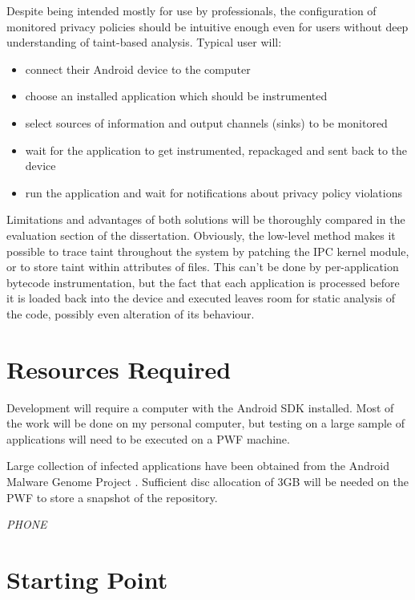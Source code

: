 \documentclass[12pt]{article}
\begin{document}
Despite being intended mostly for use by professionals, the configuration 
of monitored privacy policies should be intuitive enough even for users 
without deep understanding of taint-based analysis. Typical user will:
\begin{itemize}
\item{connect their Android device to the computer}
\item{choose an installed application which should be instrumented}
\item{select sources of information and output channels (sinks) to be
      monitored}
\item{wait for the application to get instrumented, repackaged and sent
      back to the device}
\item{run the application and wait for notifications about privacy policy
      violations}
\end{itemize}

Limitations and advantages of both solutions will be thoroughly 
compared in the evaluation section of the dissertation. Obviously, 
the low-level method makes it possible to trace taint throughout 
the system by patching the IPC kernel module, or to store taint within 
attributes of files. This can't be done by per-application bytecode 
instrumentation, but the fact that each application is processed before 
it is loaded back into the device and executed leaves room for static 
analysis of the code, possibly even alteration of its behaviour. 

\section*{Resources Required}

Development will require a computer with the Android SDK 
\cite{developer.android.com} installed. Most of the work will be done
on my personal computer, but testing on a large sample of applications
will need to be executed on a PWF machine. 

Large collection of infected applications have been obtained from the
Android Malware Genome Project \cite{www.malgenomeproject.org}. 
Sufficient disc allocation of 3GB will be needed on the PWF to store
a snapshot of the repository. 

\emph{PHONE}

\section*{Starting Point}
\end{document}
